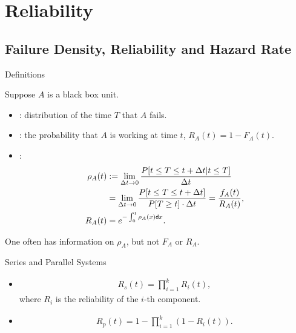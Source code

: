 \section{Reliability}

\subsection{Failure Density, Reliability and Hazard Rate}


\begin{frame}{Definitions}

Suppose $A$ is a black box unit.
\begin{itemize}
	\justifying
	\item {}: distribution of the time $T$ that $A$ fails.
	\item {}: the probability that $A$ is working at time $t$, $R_A(t) = 1 - F_A(t)$.
	\item {}: 
	\begin{align*}
	\rho_A(t) & := \lim_{\Delta t \rightarrow 0} \frac{P[t\leq T\leq t + \Delta t|t\leq T]}{\Delta t} \\
	& = \lim_{\Delta t \rightarrow 0} \frac{P[t\leq T\leq t + \Delta t]}{P[T\geq t]\cdot \Delta t} =  \frac{f_A(t)}{R_A(t)}, \\
	R_A(t) & = e^{-\int_0^t \rho_A(x)\mathsf{d}x}.
	\end{align*}
\end{itemize}
One often has information on $\rho_A$, but not $F_A$ or $R_A$.

\end{frame}


\begin{frame}{Series and Parallel Systems}

\begin{itemize}
	\item {}
	\begin{align*}
	R_s(t) = \prod_{i=1}^k R_i(t),
	\end{align*}
	where $R_i$ is the reliability of the $i$-th component.
	\item {}
	\begin{align*}
	R_p(t) = 1 - \prod_{i=1}^k(1-R_i(t)).
	\end{align*}
\end{itemize}

\end{frame}


